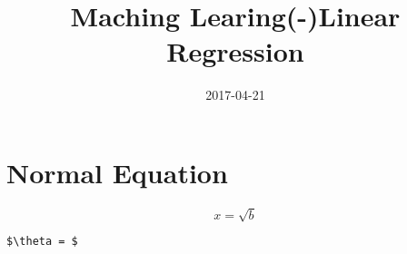 \documentclass[11pt]{article}
\date{2017-04-21}
\title{Maching Learing(-)Linear Regression}
\begin{document}
\maketitle

\section*{Normal Equation}
\label{sec:org57a6025}

\begin{equation}
     x=\sqrt{b}
\end{equation}

\begin{verbatim}
$\theta = $
\end{verbatim}
\end{document}
